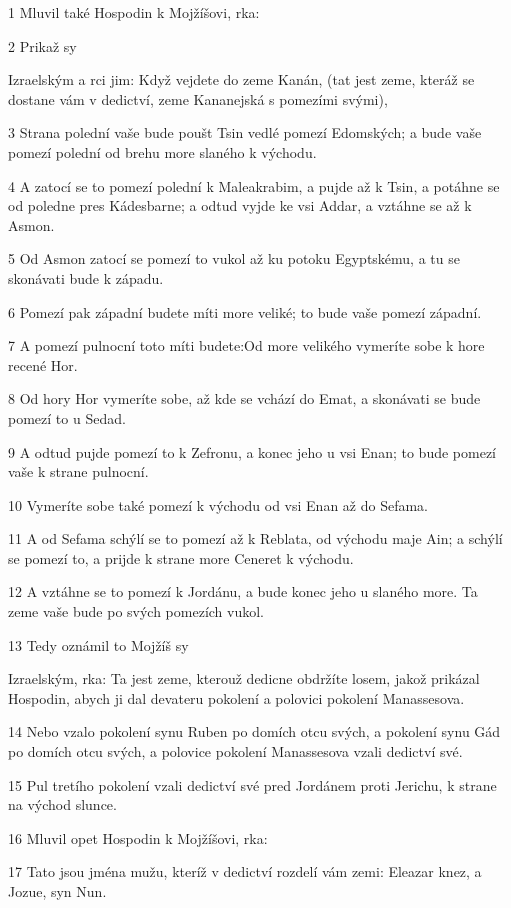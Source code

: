 \par 1 Mluvil také Hospodin k Mojžíšovi, rka:
\par 2 Prikaž sy\par Izraelským a rci jim: Když vejdete do zeme Kanán, (tat jest zeme, kteráž se dostane vám v dedictví, zeme Kananejská s pomezími svými),
\par 3 Strana polední vaše bude poušt Tsin vedlé pomezí Edomských; a bude vaše pomezí polední od brehu more slaného k východu.
\par 4 A zatocí se to pomezí polední k Maleakrabim, a pujde až k Tsin, a potáhne se od poledne pres Kádesbarne; a odtud vyjde ke vsi Addar, a vztáhne se až k Asmon.
\par 5 Od Asmon zatocí se pomezí to vukol až ku potoku Egyptskému, a tu se skonávati bude k západu.
\par 6 Pomezí pak západní budete míti more veliké; to bude vaše pomezí západní.
\par 7 A pomezí pulnocní toto míti budete:Od more velikého vymeríte sobe k hore recené Hor.
\par 8 Od hory Hor vymeríte sobe, až kde se vchází do Emat, a skonávati se bude pomezí to u Sedad.
\par 9 A odtud pujde pomezí to k Zefronu, a konec jeho u vsi Enan; to bude pomezí vaše k strane pulnocní.
\par 10 Vymeríte sobe také pomezí k východu od vsi Enan až do Sefama.
\par 11 A od Sefama schýlí se to pomezí až k Reblata, od východu maje Ain; a schýlí se pomezí to, a prijde k strane more Ceneret k východu.
\par 12 A vztáhne se to pomezí k Jordánu, a bude konec jeho u slaného more. Ta zeme vaše bude po svých pomezích vukol.
\par 13 Tedy oznámil to Mojžíš sy\par Izraelským, rka: Ta jest zeme, kterouž dedicne obdržíte losem, jakož prikázal Hospodin, abych ji dal devateru pokolení a polovici pokolení Manassesova.
\par 14 Nebo vzalo pokolení synu Ruben po domích otcu svých, a pokolení synu Gád po domích otcu svých, a polovice pokolení Manassesova vzali dedictví své.
\par 15 Pul tretího pokolení vzali dedictví své pred Jordánem proti Jerichu, k strane na východ slunce.
\par 16 Mluvil opet Hospodin k Mojžíšovi, rka:
\par 17 Tato jsou jména mužu, kteríž v dedictví rozdelí vám zemi: Eleazar knez, a Jozue, syn Nun.
